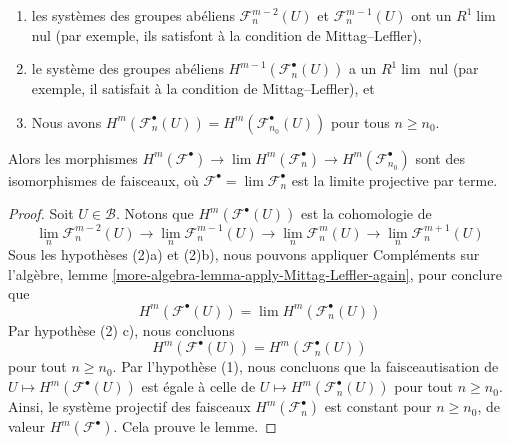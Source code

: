 {\begin{lemma}
\begin{enumerate}
\begin{enumerate}

\item les systèmes des groupes abéliens
$\mathcal{F}_n^{m - 2}(U)$ et $\mathcal{F}_n^{m - 1}(U)$
ont un $R^1\lim$ nul (par exemple, ils satisfont à la condition de Mittag--Leffler),
\item le système des groupes abéliens $H^{m - 1}(\mathcal{F}_n^\bullet(U))$
a un $R^1\lim$ nul (par exemple, il satisfait à la condition de Mittag--Leffler), et
\item Nous avons
$H^m(\mathcal{F}_n^\bullet(U)) = H^m(\mathcal{F}_{n_0}^\bullet(U))$
pour tous $n \geq n_0$.

\end{enumerate}

\end{enumerate}

Alors les morphismes
$H^m(\mathcal{F}^\bullet) \to \lim H^m(\mathcal{F}_n^\bullet) \to
H^m(\mathcal{F}_{n_0}^\bullet)$
sont des isomorphismes de faisceaux, où
$\mathcal{F}^\bullet = \lim \mathcal{F}_n^\bullet$ est la limite projective par terme.

\end{lemma}

\begin{proof}

Soit $U \in \mathcal{B}$. Notons que $H^m(\mathcal{F}^\bullet(U))$ est la cohomologie de
$$
\lim_n \mathcal{F}_n^{m - 2}(U) \to
\lim_n \mathcal{F}_n^{m - 1}(U) \to
\lim_n \mathcal{F}_n^m(U) \to
\lim_n \mathcal{F}_n^{m + 1}(U)
$$
Sous les hypothèses (2)a) et (2)b), nous pouvons appliquer Compléments sur l'algèbre, lemme \ref{more-algebra-lemma-apply-Mittag-Leffler-again},
pour conclure que
$$
H^m(\mathcal{F}^\bullet(U)) = \lim H^m(\mathcal{F}_n^\bullet(U))
$$
Par hypothèse (2) c), nous concluons
$$
H^m(\mathcal{F}^\bullet(U)) = H^m(\mathcal{F}_n^\bullet(U))
$$
pour tout $n \geq n_0$. Par l'hypothèse (1), nous concluons que la faisceautisation de
$U \mapsto H^m(\mathcal{F}^\bullet(U))$ est égale à celle de $U \mapsto H^m(\mathcal{F}_n^\bullet(U))$ pour tout $n \geq n_0$. Ainsi, le système projectif des faisceaux $H^m(\mathcal{F}_n^\bullet)$ est constant pour $n \geq n_0$, de valeur $H^m(\mathcal{F}^\bullet)$. Cela prouve le lemme.

\end{proof}











}
